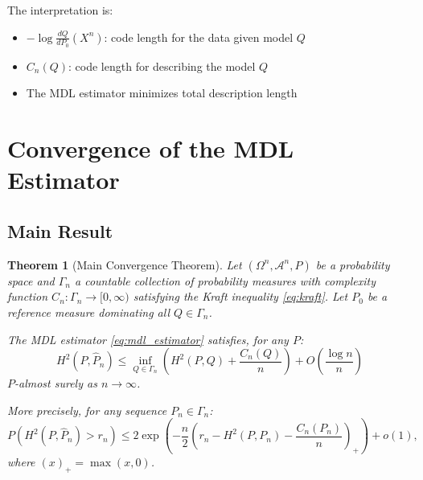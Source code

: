 \documentclass[preprint,review,12pt]{article}
\newtheorem{theorem}{Theorem}[section]
\begin{document}
The interpretation is:
\begin{itemize}
\item $-\log \frac{dQ}{dP_0}(X^n)$: code length for the data given model $Q$
\item $C_n(Q)$: code length for describing the model $Q$
\item The MDL estimator minimizes total description length
\end{itemize}

\section{Convergence of the MDL Estimator}
\label{sec:convergence}

\subsection{Main Result}

\begin{theorem}[Main Convergence Theorem]\label{thm:main}
Let $(\Omega^n, \mathcal{A}^n, P)$ be a probability space and $\Gamma_n$ a 
countable collection of probability measures with complexity function 
$C_n: \Gamma_n \to [0, \infty)$ satisfying the Kraft inequality 
\eqref{eq:kraft}. Let $P_0$ be a reference measure dominating all 
$Q \in \Gamma_n$.

The MDL estimator \eqref{eq:mdl_estimator} satisfies, for any $P$:
\begin{equation}\label{eq:main_result}
	H^2(P, \hat{P}_n) \leq \inf_{Q \in \Gamma_n} \left( H^2(P, Q) 
	+ \frac{C_n(Q)}{n} \right) + O\left( \frac{\log n}{n} \right)
\end{equation}
$P$-almost surely as $n \to \infty$.

More precisely, for any sequence $P_n \in \Gamma_n$:
\begin{equation}\label{eq:probability_bound}
	P\left( H^2(P, \hat{P}_n) > r_n \right) \leq 
	2 \exp\left( -\frac{n}{2} \left( r_n - H^2(P, P_n) - \frac{C_n(P_n)}{n} 
	\right)_+ \right) + o(1),
\end{equation}
where $(x)_+ = \max(x, 0)$.
\end{theorem}
\end{document}
